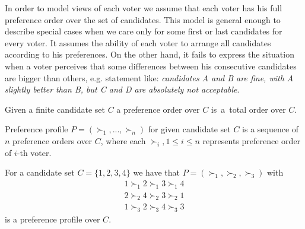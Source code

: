 In order to model views of each voter we assume that each voter has his full preference order over the set of candidates.
This model is general enough to describe special cases when we care only for some first or last candidates for every voter.
It assumes the ability of each voter to arrange all candidates according to his preferences.
On the other hand, it fails to express the situation when a voter perceives that some differences
between his consecutive candidates are bigger than others, e.g. statement like:
\textit{candidates A and B are fine, with A slightly better than B, but C and D are absolutely not acceptable}.

\begin{defn}
Given a finite candidate set $C$ a preference order over $C$
is~a~total order over $C$.
\end{defn}

\begin{defn}
Preference profile $P = (\succ_1, ... , \succ_n)$ for given candidate set $C$
is a sequence of $n$ preference orders over $C$,
where each $\succ_i, 1 \leq i \leq n$ represents preference order of $i$-th voter.
\end{defn}


\begin{exmp}
For a candidate set $C = \{1, 2, 3, 4\}$ we have that $P = (\succ_1, \succ_2, \succ_3)$ with
\begin{align*}
1 \succ_1 2 \succ_1 3 \succ_1 4 \\
2 \succ_2 4 \succ_2 3 \succ_2 1	\\
1 \succ_3 2 \succ_3 4 \succ_3 3
\end{align*}
is a preference profile over $C$.
\end{exmp}